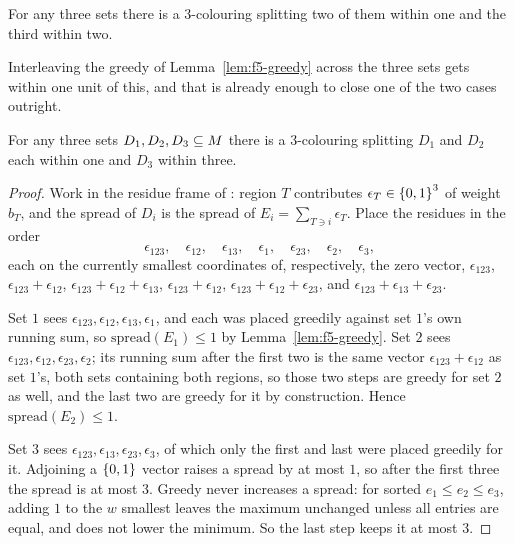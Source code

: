 \begin{conjecture}
\label{conj:f5-target}
For any three sets there is a $3$-colouring splitting two of them within one and
the third within two.
\end{conjecture}

Interleaving the greedy of Lemma~\ref{lem:f5-greedy} across the three sets gets
within one unit of this, and that is already enough to close one of the two
cases outright.

\begin{theorem}
\label{thm:f5-interleaved}
For any three sets $D_1,D_2,D_3 \subseteq M$ there is a $3$-colouring
splitting $D_1$ and $D_2$ each within one and $D_3$ within three.
\end{theorem}

\begin{proof}
Work in the residue frame of : region $T$ contributes
$\epsilon_T \in \left\{0,1\right\}^3$ of weight $b_T$, and the spread of $D_i$ is the
spread of $E_i = \sum_{T \ni i}\epsilon_T$. Place the residues in the order
\[
  \epsilon_{123},\quad \epsilon_{12},\quad \epsilon_{13},\quad \epsilon_{1},
  \quad \epsilon_{23},\quad \epsilon_{2},\quad \epsilon_{3},
\]
each on the currently smallest coordinates of, respectively, the zero vector,
$\epsilon_{123}$, $\epsilon_{123}+\epsilon_{12}$,
$\epsilon_{123}+\epsilon_{12}+\epsilon_{13}$, $\epsilon_{123}+\epsilon_{12}$,
$\epsilon_{123}+\epsilon_{12}+\epsilon_{23}$, and
$\epsilon_{123}+\epsilon_{13}+\epsilon_{23}$.

Set $1$ sees $\epsilon_{123},\epsilon_{12},\epsilon_{13},\epsilon_1$, and each was
placed greedily against set $1$'s own running sum, so
$\mathrm{spread}(E_1) \le 1$ by Lemma~\ref{lem:f5-greedy}. Set $2$ sees
$\epsilon_{123},\epsilon_{12},\epsilon_{23},\epsilon_2$; its running sum after
the first two is the same vector $\epsilon_{123}+\epsilon_{12}$ as set $1$'s,
both sets containing both regions, so those two steps are greedy for set $2$ as
well, and the last two are greedy for it by construction. Hence
$\mathrm{spread}(E_2)\le1$.

Set $3$ sees $\epsilon_{123},\epsilon_{13},\epsilon_{23},\epsilon_3$, of which
only the first and last were placed greedily for it. Adjoining a $\left\{0,1\right\}$
vector raises a spread by at most $1$, so after the first three the spread is at
most $3$. Greedy never increases a spread: for sorted $e_1 \le e_2 \le e_3$,
adding $1$ to the $w$ smallest leaves the maximum unchanged unless all entries
are equal, and does not lower the minimum. So the last step keeps it at most $3$.
\end{proof}

